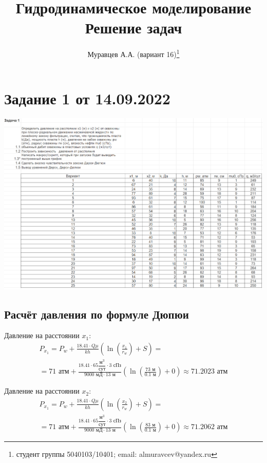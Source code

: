 \documentclass[a4paper,12pt]{article}
\begin{document}
\tableofcontents
\title{Гидродинамическое моделирование\\Решение задач}
\author{Муравцев А.А. (вариант 16)\thanks{студент группы 5040103/10401; email: almuravcev@yandex.ru}}
\maketitle


\section{Задание 1 от 14.09.2022}
\includegraphics[width=\textwidth]{task1}


\subsection{Расчёт давления по формуле Дюпюи}

Давление на расстоянии $x_1$:
\begin{multline}
P_{x_1}=P_w+\frac{18.41\cdot Q\mu}{kh}\left(\ln{\left(\frac{x_1}{r_w}\right)+S}\right)
=\\=71\text{ атм}+\frac{18.41\cdot 65\dfrac{\text{м}^3}{\text{сут}}\cdot3\text{ сПз}}{9000\text{ мД}\cdot 13\text{ м}}\left(\ln{\left(\frac{73\text{ м}}{0.1\text{ м}}\right)}+0\right)\approx 71.2023\text{ атм}
\end{multline}

Давление на расстоянии $x_2$:
\begin{multline}
P_{x_1}=P_w+\frac{18.41\cdot Q\mu}{kh}\left(\ln{\left(\frac{x_2}{r_w}\right)+S}\right)
=\\=71\text{ атм}+\frac{18.41\cdot 65\dfrac{\text{м}^3}{\text{сут}}\cdot3\text{ сПз}}{9000\text{ мД}\cdot 13\text{ м}}\left(\ln{\left(\frac{83\text{ м}}{0.1\text{ м}}\right)}+0\right)\approx 71.2062\text{ атм}
\end{multline}
\end{document}
